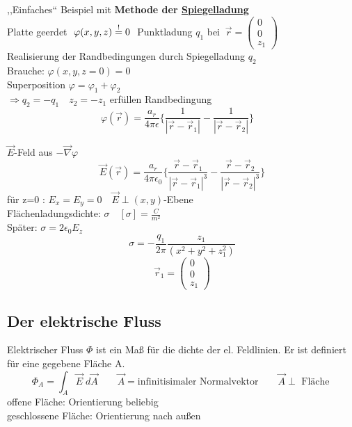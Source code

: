 \documentclass[titlepage,12pt,a4paper,ngerman]{report}
\begin{document}
,,Einfaches`` Beispiel mit \textbf{Methode der \underline{Spiegelladung}}\\
Platte geerdet $\ \varphi(x,y,z) \buildrel ! \over = 0 \ $
Punktladung $q_1$ bei $\ \vec{r} = \begin{pmatrix}
0\\
0\\
z_1
\end{pmatrix}$\\
Realisierung der Randbedingungen durch Spiegelladung $q_2$\\
Brauche: $\varphi(x,y,z=0) = 0$\\
Superposition $\varphi = \varphi_1 + \varphi_2$\\
$\Rightarrow q_2 = - q_1 \quad z_2 = - z_1$ erfüllen Randbedingung\\
$$\varphi(\vec{r}) = \frac{a_r}{4\pi\epsilon} \bigg\{ \frac{1}{|\vec{r}-\vec{r}_1|} - \frac{1}{| \vec{r} - \vec{r}_2|} \bigg \} \quad $$

$\vec{E}$-Feld aus $-\vec{\nabla} \varphi$\\
$$ \vec{E}(\vec{r}) = \frac{a_r}{4\pi\epsilon_0} \bigg\{ \frac{\vec{r} - \vec{r}_1}{|\vec{r} - \vec{r}_1|^3} - \frac{\vec{r} - \vec{r}_2}{|\vec{r} - \vec{r}_2|^3} \bigg\}$$
für z=0 : $ E_x = E_y = 0 \quad \vec{E} \perp (x,y)$-Ebene\\
Flächenladungsdichte: $\sigma \quad [\sigma] = \frac{C}{m^2}$\\
Später: $ \sigma = 2 \epsilon_0 E_z$
$$\sigma = - \frac{q_1}{2\pi} \frac{z_1}{(x^2+y^2+z_1^2)}$$
$$ \vec{r}_1 = \begin{pmatrix}
0\\0\\z_1
\end{pmatrix}$$

\subsection{Der elektrische Fluss}
Elektrischer Fluss $\Phi$ ist ein Maß für die dichte der el. Feldlinien. Er ist definiert für eine gegebene Fläche A.
$$ \boxed{\Phi_A = \int_{A} \vec{E} \;d \vec{A}} \qquad \vec{A} = \textrm{infinitisimaler Normalvektor} \qquad \vec{A} \perp \textrm{ Fläche }$$
offene Fläche: Orientierung beliebig\\
geschlossene Fläche: Orientierung nach außen\\[5pt]
\end{document}
